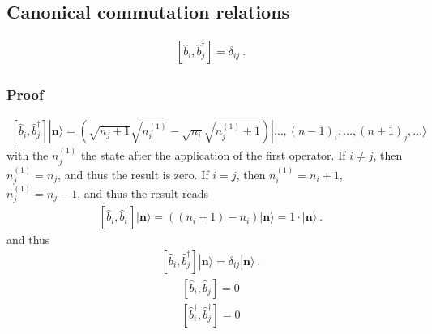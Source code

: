 \documentclass[letterpaper,10pt,english]{jupyterBook}
\begin{document}
\subsection{Canonical commutation relations}
\label{\detokenize{ch/quantum-mechanics/many-body/bosons:canonical-commutation-relations}}\label{\detokenize{ch/quantum-mechanics/many-body/bosons:quantum-mechanics-second-quantizazion-bosons-ccr}}
\sphinxAtStartPar
{}
\begin{equation*}
\begin{split}[ \hat{b}_i, \hat{b}_j^\dagger ] = \delta_{ij} \ . \end{split}
\end{equation*}\subsubsection*{Proof}
\begin{equation*}
\begin{split}[ \hat{b}_i, \hat{b}_j^\dagger ] | \mathbf{n} \rangle = \left( \sqrt{n_j+1} \sqrt{n_i^{(1)}} - \sqrt{n_i} \sqrt{n_j^{(1)}+1} \right) | \dots, (n-1)_i, \dots, (n+1)_j, \dots \rangle \end{split}
\end{equation*}
\sphinxAtStartPar
with the \(n^{(1)}_j\) the state after the application of the first operator. If \(i \ne j\), then \(n^{(1)}_{j} = n_j\), and thus the result is zero. If \(i = j\), then \(n_{i}^{(1)} = n_i + 1\), \(n_j^{(1)} = n_j - 1\), and thus the result reads
\begin{equation*}
\begin{split}[ \hat{b}_i, \hat{b}_i^\dagger ] | \mathbf{n} \rangle = \left( (n_i + 1) - n_i \right) | \mathbf{n} \rangle = 1 \cdot | \mathbf{n} \rangle \ .\end{split}
\end{equation*}
\sphinxAtStartPar
and thus
\begin{equation*}
\begin{split}[ \hat{b}_i, \hat{b}_j^\dagger ] | \mathbf{n} \rangle = \delta_{ij} | \mathbf{n} \rangle \ .\end{split}
\end{equation*}\begin{equation*}
\begin{split}[ \hat{b}_i, \hat{b}_j ] = 0\end{split}
\end{equation*}\begin{equation*}
\begin{split}[ \hat{b}_i^\dagger, \hat{b}_j^\dagger ] = 0\end{split}
\end{equation*}
\sphinxstepscope
\end{document}
